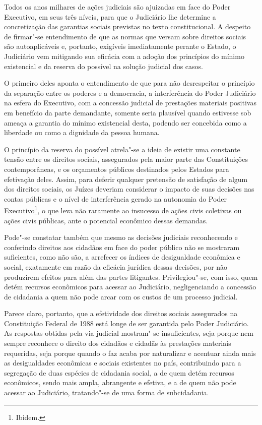 Todos os anos milhares de ações judiciais são ajuizadas em face do Poder
Executivo, em seus três níveis, para que o Judiciário lhe determine a
concretização das garantias sociais previstas no texto constitucional. A
despeito de firmar"-se entendimento de que as normas que versam sobre
direitos sociais são autoaplicáveis e, portanto, exigíveis imediatamente
perante o Estado, o Judiciário vem mitigando sua eficácia com a adoção
dos princípios do mínimo existencial e da reserva do possível na solução
judicial dos casos.

O primeiro deles aponta o entendimento de que para não desrespeitar o
princípio da separação entre os poderes e a democracia, a interferência
do Poder Judiciário na esfera do Executivo, com a concessão judicial de
prestações materiais positivas em benefício da parte demandante, somente
seria plausível quando estivesse sob ameaça a garantia do mínimo
existencial desta, podendo ser concebida como a liberdade ou como a
dignidade da pessoa humana.

O princípio da reserva do possível atrela"-se a ideia de existir uma
constante tensão entre os direitos sociais, assegurados pela maior parte
das Constituições contemporâneas, e os orçamentos públicos destinados
pelos Estados para efetivação deles. Assim, para deferir qualquer
pretensão de satisfação de algum dos direitos sociais, os Juízes
deveriam considerar o impacto de suas decisões nas contas públicas e o
nível de interferência gerado na autonomia do Poder Executivo\footnote{Ibidem.},
o que leva não raramente ao insucesso de ações civis coletivas ou ações
civis públicas, ante o potencial econômico dessas demandas.

Pode"-se constatar também que mesmo as decisões judiciais reconhecendo e
conferindo direitos aos cidadãos em face do poder público não se
mostraram suficientes, como não são, a arrefecer os índices de
desigualdade econômica e social, exatamente em razão da eficácia
jurídica dessas decisões, por não produzirem efeitos para além das
partes litigantes. Privilegiou"-se, com isso, quem detém recursos
econômicos para acessar ao Judiciário, negligenciando a concessão de
cidadania a quem não pode arcar com os custos de um processo judicial.

Parece claro, portanto, que a efetividade dos direitos sociais
assegurados na Constituição Federal de 1988 está longe de ser garantida
pelo Poder Judiciário. As respostas obtidas pela via judicial mostram"-se
insuficientes, seja porque nem sempre reconhece o direito dos cidadãos e
cidadãs às prestações materiais requeridas, seja porque quando o faz
acaba por naturalizar e acentuar ainda mais as desigualdades econômicas
e sociais existentes no país, contribuindo para a segregação de duas
espécies de cidadania social, a de quem detém recursos econômicos, sendo
mais ampla, abrangente e efetiva, e a de quem não pode acessar ao
Judiciário, tratando"-se de uma forma de subcidadania.

